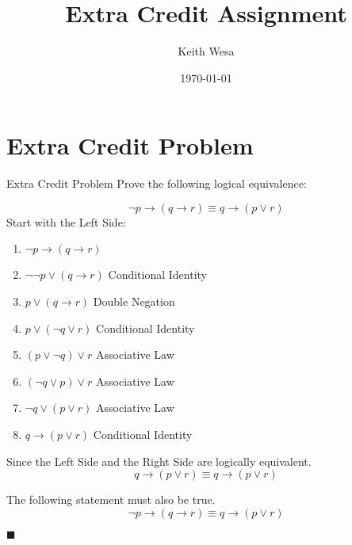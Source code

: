 



\title{Extra Credit Assignment}
\author{Keith Wesa}
\date{\today}



\section*{Extra Credit Problem}
\begin{homeworkProblem}{Extra Credit Problem}
Prove the following logical equivalence:

\[
\lnot p \rightarrow (q \rightarrow r) \equiv q \rightarrow (p \lor r) 
\]
    Start with the Left Side:
\begin{enumerate}
\item[] $\lnot p \rightarrow (q \rightarrow r)$
\item[] $\lnot\lnot p \lor (q \rightarrow r)$  \hspace{1cm} Conditional Identity
\item[] $p \lor (q \rightarrow r)$  \hspace{1cm}  Double Negation
\item[] $p \lor (\lnot q \lor r)$  \hspace{1cm}  Conditional Identity
\item[] $(p \lor \lnot q) \lor r$  \hspace{1cm}  Associative Law
\item[] $(\lnot q \lor p) \lor r$  \hspace{1cm}  Associative Law
\item[] $\lnot q \lor (p \lor r)$  \hspace{1cm}  Associative Law
\item []$q \rightarrow (p \lor r)$ \hspace{1cm}  Conditional Identity
\end{enumerate}

    Since the Left Side and the Right Side are logically equivalent.
    \[
        q \rightarrow (p \lor r) \equiv q \rightarrow (p \lor r)
    \]

    The following statement must also be true.
    \[
        \lnot p \rightarrow (q \rightarrow r) \equiv q \rightarrow (p \lor r)
    \]
    \begin{flushright}
        $\blacksquare$
    \end{flushright}    
\end{homeworkProblem}




